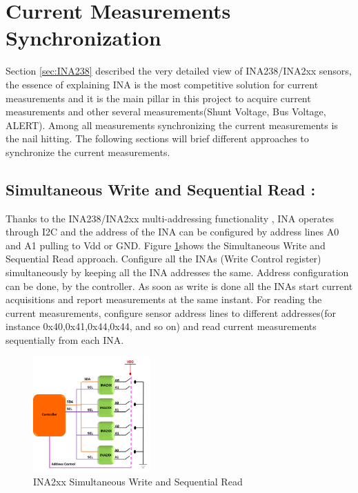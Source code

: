 \section{Current Measurements Synchronization}
Section \ref{sec:INA238} described the very detailed view of INA238/INA2xx sensors, the essence of explaining INA is the most competitive solution for current measurements and it is the main pillar in this project to acquire current measurements and other several measurements(Shunt Voltage, Bus Voltage, ALERT). Among all measurements synchronizing the current measurements is the nail hitting. The following sections will brief different approaches to synchronize the current measurements.

\subsection{Simultaneous Write and Sequential Read :}
Thanks to the INA238/INA2xx multi-addressing functionality \cite[p.18]{INA238_User_Datasheet}, INA operates through I2C and the address of the INA can be configured by address lines A0 and A1 pulling to Vdd or GND. Figure \ref{fig:INA2xx_Simultaneous_Write_and_Sequential_Read}shows the Simultaneous Write and Sequential Read approach. Configure all the INAs (Write Control register) simultaneously by keeping all the INA addresses the same. Address configuration can be done, by the controller. As soon as write is done all the INAs start current acquisitions and report measurements at the same instant. For reading the current measurements, configure sensor address lines to different addresses(for instance 0x40,0x41,0x44,0x44, and so on) and read current measurements sequentially from each  INA.

\begin{figure}
    \centering
    \includegraphics[width=0.4\textwidth]{Chap05/Figures/INA_MultiWrite.PNG}
    \caption{INA2xx Simultaneous Write and Sequential Read}
    \label{fig:INA2xx_Simultaneous_Write_and_Sequential_Read}
\end{figure}

